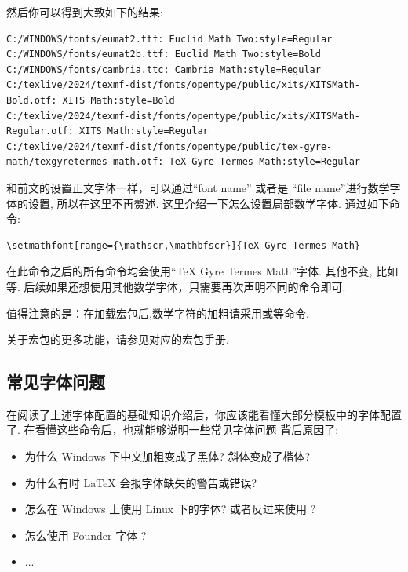 然后你可以得到大致如下的结果:
\begin{verbatim}
C:/WINDOWS/fonts/eumat2.ttf: Euclid Math Two:style=Regular
C:/WINDOWS/fonts/eumat2b.ttf: Euclid Math Two:style=Bold
C:/WINDOWS/fonts/cambria.ttc: Cambria Math:style=Regular
C:/texlive/2024/texmf-dist/fonts/opentype/public/xits/XITSMath-Bold.otf: XITS Math:style=Bold
C:/texlive/2024/texmf-dist/fonts/opentype/public/xits/XITSMath-Regular.otf: XITS Math:style=Regular
C:/texlive/2024/texmf-dist/fonts/opentype/public/tex-gyre-math/texgyretermes-math.otf: TeX Gyre Termes Math:style=Regular
\end{verbatim}

和前文的设置正文字体一样，可以通过``font name'' 或者是 ``file name''进行数学字体的设置, 所以在这里不再赘述. 
这里介绍一下怎么设置局部数学字体. 通过如下命令:
\begin{verbatim}
\setmathfont[range={\mathscr,\mathbfscr}]{TeX Gyre Termes Math}
\end{verbatim}

在此命令之后的所有\cmd[F]{\mathscr, \mathbfscr}命令均会使用``TeX Gyre Termes Math''字体. 其他不变, 比如\cmd[F]{\mathrm, \mathbf}等.
后续如果还想使用其他数学字体，只需要再次声明不同的\cmd[F]{\setmathfont}命令即可.

\begin{remark}
值得注意的是：在加载宏包后,数学字符的加粗请采用\cmd[F]{\boldsymbol}或\cmd[F]{\symbf, \symbfit, \symbfup}等命令.
\end{remark}

关于宏包的更多功能，请参见对应的宏包手册. 


\subsection{常见字体问题}
在阅读了上述字体配置的基础知识介绍后，你应该能看懂大部分模板中的字体配置了. 在看懂这些命令后，也就能够说明一些常见字体问题
背后原因了:
\begin{itemize}
    \item 为什么 Windows 下中文加粗变成了黑体? 斜体变成了楷体?
    \item 为什么有时 \LaTeX{} 会报字体缺失的警告或错误?
    \item 怎么在 Windows 上使用 Linux 下的字体? 或者反过来使用 ?
    \item 怎么使用 Founder 字体 ?
    \item ...
\end{itemize}

